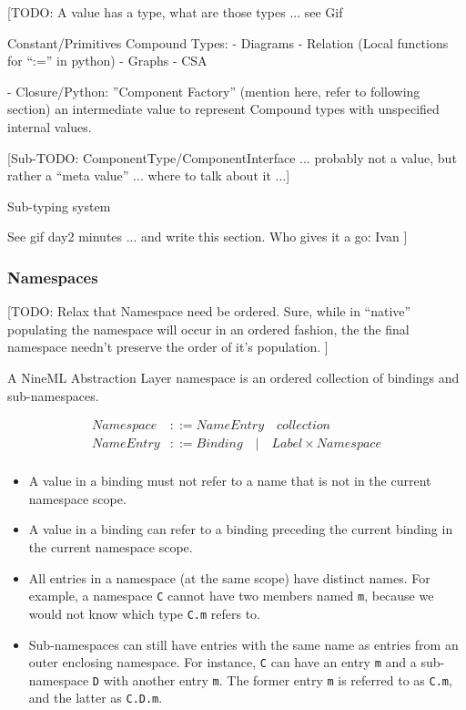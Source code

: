 \documentclass[a4paper]{article}
\begin{document}
[TODO: A value has a type, what are those types ... see Gif 

Constant/Primitives
Compound Types:
- Diagrams
- Relation (Local functions for ``:='' in python)
- Graphs
- CSA

- Closure/Python: ''Component Factory'' (mention here, refer to following section)
  an intermediate value to represent Compound types with 
  unspecified internal values.




[Sub-TODO: ComponentType/ComponentInterface ... probably not a
value, but rather a ``meta value'' ... where to talk about it ...]


Sub-typing system

See gif day2 minutes ... and write this section.
Who gives it a go: Ivan
]


\subsubsection{Namespaces}

[TODO: Relax that Namespace need be ordered.  Sure, while in ``native'' populating 
the namespace will occur in an ordered fashion, the the final namespace
needn't preserve the order of it's population. ] 

A NineML Abstraction Layer namespace is an ordered collection of
bindings and sub-namespaces. 

\begin{equation*}
\begin{array}{ll}
   Namespace & ::= NameEntry \quad collection \\
   NameEntry & ::= Binding \quad  \lvert \quad Label \times Namespace \\
\end{array}
\end{equation*}

\begin{itemize}
\item A value in a binding must not refer to a name that is not in the
  current namespace scope.
\item A value in a binding can refer to a binding preceding the current binding in the
  current namespace scope.
\item All entries in a namespace (at the same scope) have distinct
  names. For example, a namespace \verb^C^ cannot have two members
  named \verb^m^, because we would not know which type \verb^C.m^
  refers to.
\item Sub-namespaces can still have entries with the same name as
  entries from an outer enclosing namespace. For instance, \verb^C^
  can have an entry \verb^m^ and a sub-namespace \verb^D^ with another
  entry \verb^m^.  The former entry \verb^m^ is referred to as
  \verb^C.m^, and the latter as \verb^C.D.m^.
\end{itemize}
\end{document}
